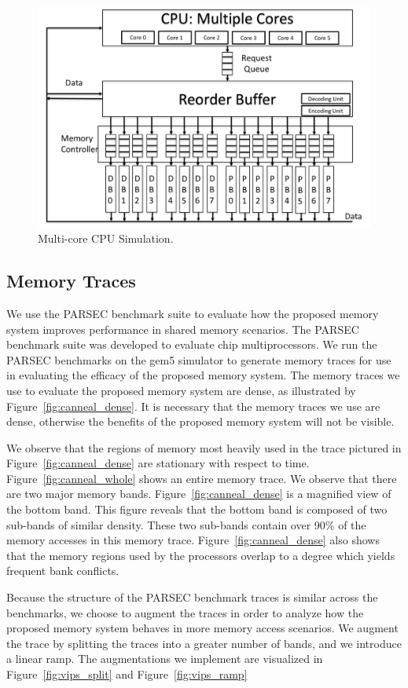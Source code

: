 \begin{figure}[h!] \centering
\includegraphics[width=0.9\linewidth]{figures/multi-core-cpu.png} 
\caption{Multi-core CPU Simulation.}
\label{fig:multi-core-cpu}
\end{figure}

\subsection{Memory Traces}
We use the PARSEC benchmark suite to evaluate how the proposed memory system improves performance in shared memory scenarios. The PARSEC benchmark suite was developed to evaluate chip multiprocessors. We run the PARSEC benchmarks on the gem5 simulator to generate memory traces for use in evaluating the efficacy of the proposed memory system. The memory traces we use to evaluate the proposed memory system are dense, as illustrated by Figure~\ref{fig:canneal_dense}. It is necessary that the memory traces we use are dense, otherwise the benefits of the proposed memory system will not be visible.
 
We observe that the regions of memory most heavily used in the trace pictured in Figure~\ref{fig:canneal_dense} are stationary with respect to time. Figure~\ref{fig:canneal_whole} shows an entire memory trace. We observe that there are two major memory bands. Figure~\ref{fig:canneal_dense} is a magnified view of the bottom band. This figure reveals that the bottom band is composed of two sub-bands of similar density. These two sub-bands contain over 90\% of the memory accesses in this memory trace. Figure~\ref{fig:canneal_dense} also shows that the memory regions used by the processors overlap to a degree which yields frequent bank conflicts.

Because the structure of the PARSEC benchmark traces is similar across the benchmarks, we choose to augment the traces in order to analyze how the proposed memory system behaves in more memory access scenarios. We augment the trace by splitting the traces into a greater number of bands, and we introduce a linear ramp. The augmentations we implement are visualized in Figure~\ref{fig:vips_split} and Figure~\ref{fig:vips_ramp}

